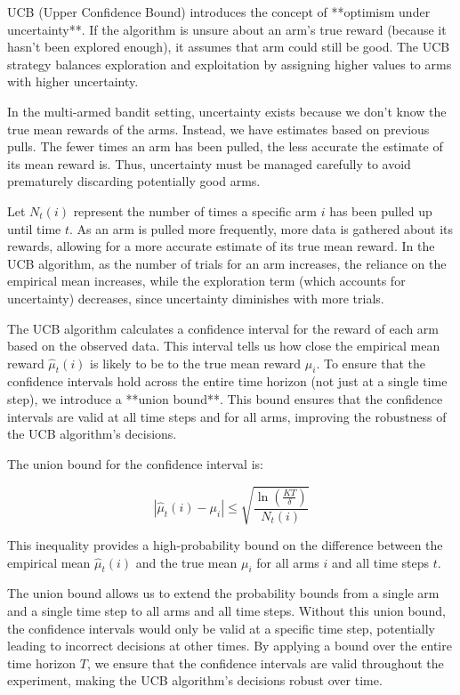 UCB (Upper Confidence Bound) introduces the concept of **optimism under uncertainty**. If the algorithm is unsure about an arm’s true reward (because it hasn’t been explored enough), it assumes that arm could still be good. The UCB strategy balances exploration and exploitation by assigning higher values to arms with higher uncertainty.

In the multi-armed bandit setting, uncertainty exists because we don’t know the true mean rewards of the arms. Instead, we have estimates based on previous pulls. The fewer times an arm has been pulled, the less accurate the estimate of its mean reward is. Thus, uncertainty must be managed carefully to avoid prematurely discarding potentially good arms.

Let $N_t(i)$ represent the number of times a specific arm $i$ has been pulled up until time $t$. As an arm is pulled more frequently, more data is gathered about its rewards, allowing for a more accurate estimate of its true mean reward. In the UCB algorithm, as the number of trials for an arm increases, the reliance on the empirical mean increases, while the exploration term (which accounts for uncertainty) decreases, since uncertainty diminishes with more trials.

The UCB algorithm calculates a confidence interval for the reward of each arm based on the observed data. This interval tells us how close the empirical mean reward $\hat{\mu}_t(i)$ is likely to be to the true mean reward $\mu_i$. To ensure that the confidence intervals hold across the entire time horizon (not just at a single time step), we introduce a **union bound**. This bound ensures that the confidence intervals are valid at all time steps and for all arms, improving the robustness of the UCB algorithm's decisions.

The union bound for the confidence interval is:

$$
    |\hat{\mu}_t(i) - \mu_i| \leq \sqrt{\frac{\ln\left(\frac{KT}{\delta}\right)}{N_t(i)}}
$$

This inequality provides a high-probability bound on the difference between the empirical mean $\hat{\mu}_t(i)$ and the true mean $\mu_i$ for all arms $i$ and all time steps $t$.

The union bound allows us to extend the probability bounds from a single arm and a single time step to all arms and all time steps. Without this union bound, the confidence intervals would only be valid at a specific time step, potentially leading to incorrect decisions at other times. By applying a bound over the entire time horizon $T$, we ensure that the confidence intervals are valid throughout the experiment, making the UCB algorithm's decisions robust over time.

